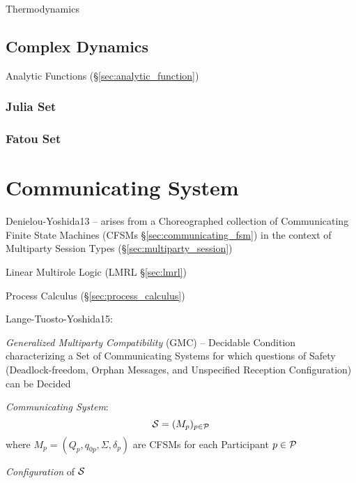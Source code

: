 Thermodynamics



\subsection{Complex Dynamics}\label{sec:complex_dynamics}

Analytic Functions (\S\ref{sec:analytic_function})



\subsubsection{Julia Set}\label{sec:julia_set}

\subsubsection{Fatou Set}\label{sec:fatou_set}



\section{Communicating System}\label{sec:communicating_system}

Denielou-Yoshida13 -- arises from a Choreographed collection of
Communicating Finite State Machines (CFSMs
\S\ref{sec:communicating_fsm}) in the context of Multiparty Session
Types (\S\ref{sec:multiparty_session})

Linear Multirole Logic (LMRL \S\ref{sec:lmrl})

\fist Process Calculus (\S\ref{sec:process_calculus})

Lange-Tuosto-Yoshida15:

\emph{Generalized Multiparty Compatibility} (GMC) -- Decidable
Condition characterizing a Set of Communicating Systems for which
questions of Safety (Deadlock-freedom, Orphan Messages, and
Unspecified Reception Configuration) can be Decided

\emph{Communicating System}:
\[
  \mathcal{S} = (M_p)_{p \in \mathcal{P}}
\]
where $M_p = (Q_p, q_{0p}, \Sigma, \delta_p)$ are CFSMs for each
Participant $p \in \mathcal{P}$

\emph{Configuration} of $\mathcal{S}$ %




